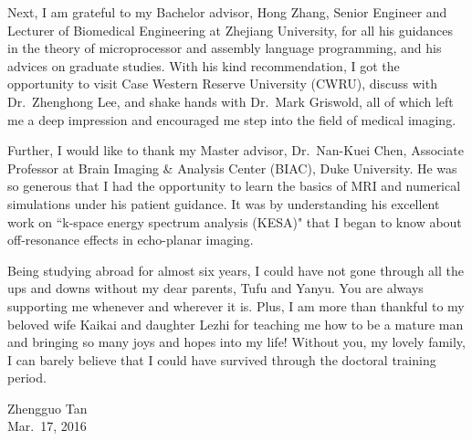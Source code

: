 Next, I am grateful to my Bachelor advisor, Hong Zhang, Senior Engineer and Lecturer of Biomedical Engineering at Zhejiang University, for all his guidances in the theory of microprocessor and assembly language programming, and his advices on graduate studies. With his kind recommendation, I got the opportunity to visit Case Western Reserve University (CWRU), discuss with Dr.~Zhenghong Lee, and shake hands with Dr.~Mark Griswold, all of which left me a deep impression and encouraged me step into the field of medical imaging.

Further, I would like to thank my Master advisor, Dr.~Nan-Kuei Chen, Associate Professor at Brain Imaging \& Analysis Center (BIAC), Duke University. He was so generous that I had the opportunity to learn the basics of MRI and numerical simulations under his patient guidance. It was by understanding his excellent work on ``k-space energy spectrum analysis (\acs{KESA})" that I began to know about off-resonance effects in echo-planar imaging.

Being studying abroad for almost six years, I could have not gone through all the ups and downs without my dear parents, Tufu and Yanyu. You are always supporting me whenever and wherever it is. Plus, I am more than thankful to my beloved wife Kaikai and daughter Lezhi for teaching me how to be a mature man and bringing so many joys and hopes into my life! Without you, my lovely family, I can barely believe that I could have survived through the doctoral training period.


\begin{flushright}
  Zhengguo Tan \\
  Mar.~17, 2016
\end{flushright}

